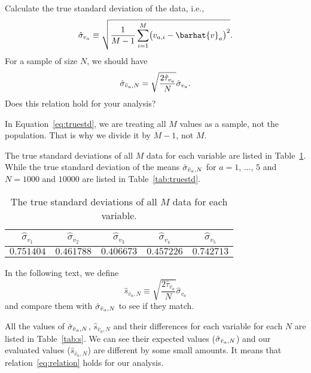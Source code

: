 \Question{} Calculate the true standard deviation of the data, i.e.,
%
\begin{equation}\label{eq:truestd}
    \hat{\sigma}_{v_a} \equiv \sqrt{\frac{ 1 }{ M - 1 }
        \sum_{i=1}^M \bigl( v_{a,i} - \barhat{v}_a \bigr)^2}.
\end{equation}
%
For a sample of size \(N\), we should have
%
\begin{equation}\label{eq:relation}
    \hat{\sigma}_{\bar{v}_a,N} = \sqrt{\frac{ 2 \hat{\tau}_{v_a} }{ N }} \hat{\sigma}_{v_a}.
\end{equation}
%
Does this relation hold for your analysis?

\Answer{}
In Equation~\eqref{eq:truestd}, we are treating all \(M\) values as a sample,
not the population.
That is why we divide it by \(M - 1\), not \(M\).

The true standard deviations of all \(M\) data for each variable are
listed in Table~\ref{tab:std}.
While the true standard deviation of the means
\(\hat{\sigma}_{\bar{v}_a,N}\) for \(a = 1\), \(\ldots\), \(5\) and \(N = 1000\) and \(10000\) are
listed in Table~\ref{tab:truestd}.

\begin{table}[H]
    \centering
    \caption{The true standard deviations of all \(M\) data for each variable.}
    \label{tab:std}
    \begin{tabular}{@{}ccccc@{}}
        \toprule
        \(\hat{\sigma}_{v_1}\) & \(\hat{\sigma}_{v_2}\) & \(\hat{\sigma}_{v_3}\) & \(\hat{\sigma}_{v_4}\) & \(\hat{\sigma}_{v_5}\) \\
        \midrule
        \(0.751404\)           & \(0.461788\)           & \(0.406673\)           & \(0.457226\)           & \(0.742713\)           \\
        \bottomrule
    \end{tabular}
\end{table}

In the following text, we define
%
\begin{equation}
    \hat{s}_{\bar{v}_a,N} \equiv \sqrt{\frac{ 2 \hat{\tau}_{v_a} }{ N }} \hat{\sigma}_{v_a}
\end{equation}
%
and compare them with \(\hat{\sigma}_{\bar{v}_a,N}\) to see if they match.

All the values of \(\hat{\sigma}_{\bar{v}_a,N}\), \(\hat{s}_{\bar{v}_a,N}\) and their differences
for each variable for each \(N\) are listed in Table~\ref{tab:s}.
We can see their expected values (\(\hat{\sigma}_{\bar{v}_a,N}\)) and our evaluated values
(\(\hat{s}_{\bar{v}_a,N}\)) are different by some small amounts.
It means that relation~\eqref{eq:relation} holds for our analysis.

